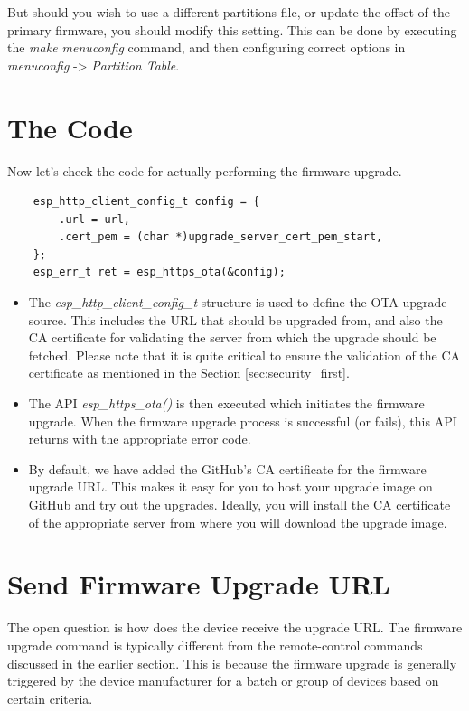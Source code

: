 \documentclass[main.tex]{subfiles}
\begin{document}
But should you wish to use a different partitions file, or update the offset of the primary firmware, you should modify this setting. This can be done by executing the \textit{make menuconfig} command, and then configuring correct options in \textit{menuconfig} -> \textit{Partition Table}.

\section{The Code}
Now let's check the code for actually performing the firmware upgrade.

\begin{verbatim}
    esp_http_client_config_t config = {
        .url = url,
        .cert_pem = (char *)upgrade_server_cert_pem_start,
    };
    esp_err_t ret = esp_https_ota(&config);
\end{verbatim}

\begin{itemize}
    \item The \textit{esp\_http\_client\_config\_t} structure is used to define the OTA upgrade source. This includes the URL that should be upgraded from, and also the CA certificate for validating the server from which the upgrade should be fetched. Please note that it is quite critical to ensure the validation of the CA certificate as mentioned in the Section \ref{sec:security_first}.
    \item The API \textit{esp\_https\_ota()} is then executed which initiates the firmware upgrade. When the firmware upgrade process is successful (or fails), this API returns with the appropriate error code.
    \item By default, we have added the GitHub's CA certificate for the firmware upgrade URL. This makes it easy for you to host your upgrade image on GitHub and try out the upgrades. Ideally, you will install the CA certificate of the appropriate server from where you will download the upgrade image.
\end{itemize}

\section{Send Firmware Upgrade URL}
The open question is how does the device receive the upgrade URL. The firmware upgrade command is typically different from the remote-control commands discussed in the earlier section. This is because the firmware upgrade is generally triggered by the device manufacturer for a batch or group of devices based on certain criteria.
\end{document}
